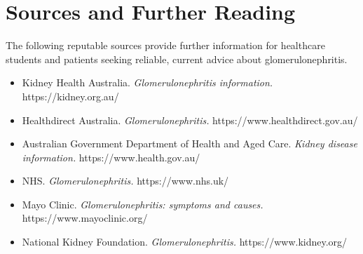 \section*{Sources and Further Reading}
The following reputable sources provide further information for healthcare students and patients seeking reliable, current advice about glomerulonephritis.

\begin{itemize}
    \item Kidney Health Australia. \textit{Glomerulonephritis information.} https://kidney.org.au/
    \item Healthdirect Australia. \textit{Glomerulonephritis.} https://www.healthdirect.gov.au/
    \item Australian Government Department of Health and Aged Care. \textit{Kidney disease information.} https://www.health.gov.au/
    \item NHS. \textit{Glomerulonephritis.} https://www.nhs.uk/
    \item Mayo Clinic. \textit{Glomerulonephritis: symptoms and causes.} https://www.mayoclinic.org/
    \item National Kidney Foundation. \textit{Glomerulonephritis.} https://www.kidney.org/
\end{itemize}

